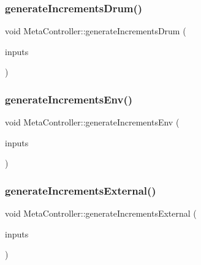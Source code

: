 \subsubsection{\texorpdfstring{generate\+Increments\+Drum()}{generateIncrementsDrum()}}
{\footnotesize\ttfamily void Meta\+Controller\+::generate\+Increments\+Drum (\begin{DoxyParamCaption}\item[{\mbox{\hyperlink{class_via_input_streams}{Via\+Input\+Streams}} $\ast$}]{inputs }\end{DoxyParamCaption})}

\mbox{\label{class_meta_controller_ab5edafda7b2d14c42b80d56b3c1aba09}} 
\subsubsection{\texorpdfstring{generate\+Increments\+Env()}{generateIncrementsEnv()}}
{\footnotesize\ttfamily void Meta\+Controller\+::generate\+Increments\+Env (\begin{DoxyParamCaption}\item[{\mbox{\hyperlink{class_via_input_streams}{Via\+Input\+Streams}} $\ast$}]{inputs }\end{DoxyParamCaption})}

\mbox{\label{class_meta_controller_a37edb9a2541a99701a7095c5df577b63}} 
\subsubsection{\texorpdfstring{generate\+Increments\+External()}{generateIncrementsExternal()}}
{\footnotesize\ttfamily void Meta\+Controller\+::generate\+Increments\+External (\begin{DoxyParamCaption}\item[{\mbox{\hyperlink{class_via_input_streams}{Via\+Input\+Streams}} $\ast$}]{inputs }\end{DoxyParamCaption})}

\mbox{\label{class_meta_controller_ab78ff8455308bff2fb7ebff51c33790b}} 
